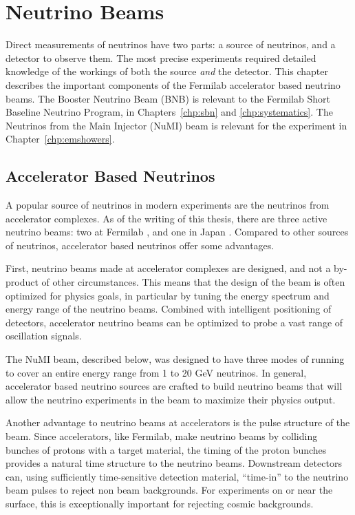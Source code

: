 \chapter{\label{chp:beams} Neutrino Beams}

Direct measurements of neutrinos have two parts: a source of neutrinos, and a detector to observe them.  The most precise experiments required detailed knowledge of the workings of both the source {\em and} the detector.  This chapter describes the important components of the Fermilab accelerator based neutrino beams.  The Booster Neutrino Beam (BNB) is relevant to the Fermilab Short Baseline Neutrino Program, in Chapters~\ref{chp:sbn} and \ref{chp:systematics}.  The Neutrinos from the Main Injector (NuMI) beam is relevant for the \argoneut experiment in Chapter~\ref{chp:emshowers}. 

\section{Accelerator Based Neutrinos}

A popular source of neutrinos in modern experiments are the neutrinos from accelerator complexes.  As of the writing of this thesis, there are three active neutrino beams: two at Fermilab \cite{Adamson:2015dkw, AguilarArevalo:2008yp}, and one in Japan \cite{Abe:2014oxa}.  Compared to other sources of neutrinos, accelerator based neutrinos offer some advantages.

First, neutrino beams made at accelerator complexes are designed, and not a by-product of other circumstances.  This means that the design of the beam is often optimized for physics goals, in particular by tuning the energy spectrum and energy range of the neutrino beams.  Combined with intelligent positioning of detectors, accelerator neutrino beams can be optimized to probe a vast range of oscillation signals.

The NuMI beam, described below, was designed to have three modes of running to cover an entire energy range from 1 to 20 GeV neutrinos.  In general, accelerator based neutrino sources are crafted to build neutrino beams that will allow the neutrino experiments in the beam to maximize their physics output.

Another advantage to neutrino beams at accelerators is the pulse structure of the beam.  Since accelerators, like Fermilab, make neutrino beams by colliding bunches of protons with a target material, the timing of the proton bunches provides a natural time structure to the neutrino beams.  Downstream detectors can, using sufficiently time-sensitive detection material, ``time-in'' to the neutrino beam pulses to reject non beam backgrounds.  For experiments on or near the surface, this is exceptionally important for rejecting cosmic backgrounds.

